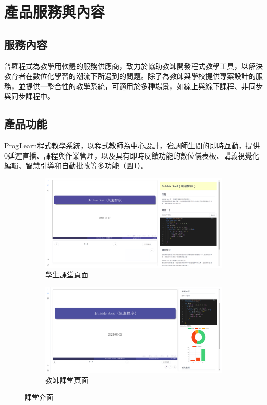 \section{產品服務與內容}

\subsection{服務內容}

普羅程式為教學用軟體的服務供應商，致力於協助教師開發程式教學工具，以解決教育者在數位化學習的潮流下所遇到的問題。除了為教師與學校提供專案設計的服務，並提供一整合性的教學系統，可適用於多種場景，如線上與線下課程、非同步與同步課程中。

\subsection{產品功能}

ProgLearn程式教學系統，以程式教師為中心設計，強調師生間的即時互動，提供0延遲直播、課程與作業管理，以及具有即時反饋功能的數位儀表板、講義視覺化編輯、智慧引導和自動批改等多功能（圖\ref{fig:Classroom}）。

\begin{figure}[H]
  \begin{subfigure}{0.5\linewidth}
    \centering
    \includegraphics[width=1\textwidth]{images/student.png}
    \caption{學生課堂頁面}
  \end{subfigure}
  \begin{subfigure}{0.5\linewidth}
    \centering
    \includegraphics[width=1\textwidth]{images/teacher.png}
    \caption{教師課堂頁面}
  \end{subfigure}
  \caption{課堂介面}
  \label{fig:Classroom}
\end{figure}

